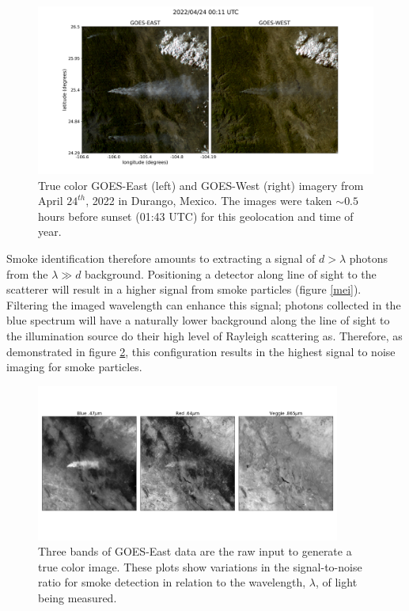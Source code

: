 \documentclass{article}
\begin{document}
\begin{figure}
    \centering
    \includegraphics[width=12cm]{figures/G16_v_G17.png}
    \caption{True color GOES-East (left) and GOES-West (right) imagery from April \(24^{th}\), 2022 in Durango, Mexico. The images were taken \(\sim0.5\) hours before sunset (01:43 UTC) for this geolocation and time of year.}\label{16_vs_17}
\end{figure}

Smoke identification therefore amounts to extracting a signal of \(d > \lambda\) photons from the \(\lambda \gg d\) background. Positioning a detector along line of sight to the scatterer will result in a higher signal from smoke particles (figure \ref{mei}). Filtering the imaged wavelength can enhance this signal; photons collected in the blue spectrum will have a naturally lower background along the line of sight to the illumination source do their high level of Rayleigh scattering as. Therefore, as demonstrated in figure \ref{bands}, this configuration results in the highest signal to noise imaging for smoke particles. 

\begin{figure}
    \centering
    \includegraphics[width=10cm]{figures/GOES16_bands.png}
    \caption{Three bands of GOES-East data are the raw input to generate a true color image. These plots show variations in the signal-to-noise ratio for smoke detection in relation to the wavelength, \(\lambda\), of light being measured.}\label{bands}
\end{figure}
\end{document}
